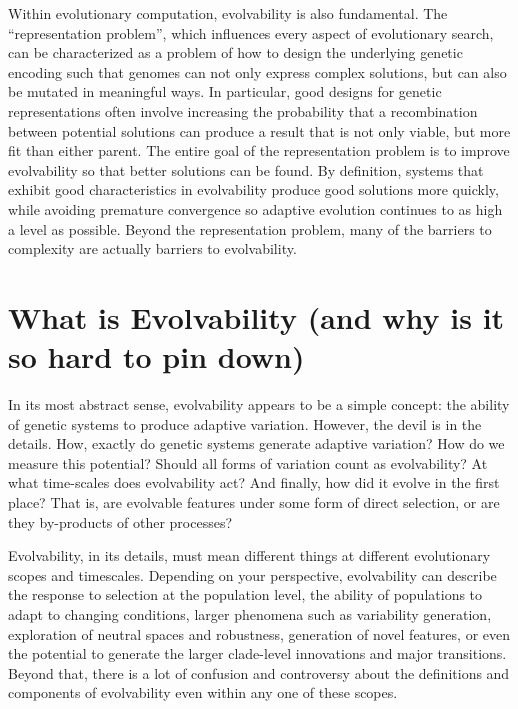 \documentclass[PhD]{msu-thesis}
\begin{document}
Within evolutionary computation, evolvability is also fundamental. The ``representation problem'', which influences every aspect of evolutionary search, can be characterized as a problem of how to design the underlying genetic encoding such that genomes can not only express complex solutions, but can also be mutated in meaningful ways\cite{dawkins_13_2003}. In particular, good designs for genetic representations often involve increasing the probability that a recombination between potential solutions can produce a result that is not only viable, but more fit than either parent. The entire goal of the representation problem is to improve evolvability so that better solutions can be found. By definition, systems that exhibit good characteristics in evolvability produce good solutions more quickly, while avoiding premature convergence\cite{altenberg_evolution_1994} so adaptive evolution continues to as high a level as possible. Beyond the representation problem, many of the barriers to complexity are actually barriers to evolvability.

\section{What is Evolvability (and why is it so hard to pin down)}
In its most abstract sense, evolvability appears to be a simple concept: the ability of genetic systems to produce adaptive variation. However, the devil is in the details. How, exactly do genetic systems generate adaptive variation? How do we measure this potential? Should all forms of variation count as evolvability? At what time-scales does evolvability act? And finally, how did it evolve in the first place? That is, are evolvable features under some form of direct selection, or are they by-products of other processes?

Evolvability, in its details, must mean different things at different evolutionary scopes and timescales. 
Depending on your perspective, evolvability can describe the response to selection at the population level\cite{fisher_genetical_1930,houle_comparing_1992}, the ability of populations to adapt to changing conditions\cite{belle_code_2002}, 
larger phenomena such as variability generation\cite{gunter_p._wagner_perspective:_1996}, 
exploration of neutral spaces and robustness\cite{andreas_wagner_robustness_2005,kitano_biological_2004}, 
generation of novel features\cite{alberch_genes_1991,brookfield_evolution:_2001}, 
or even the potential to generate the larger clade-level innovations\cite{kirschner_evolvability_1998} 
and major transitions\cite{smith_major_1995}. 
Beyond that, there is a lot of confusion and controversy about the definitions and components of evolvability even within any one of these scopes\cite{pigliucci_is_2008}.
\end{document}
